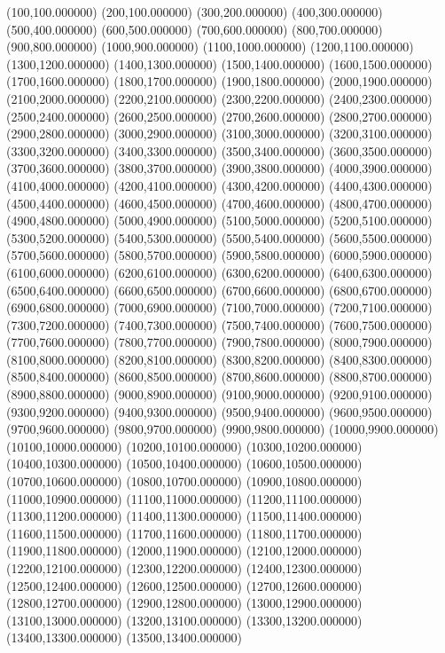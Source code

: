 (100,100.000000)
(200,100.000000)
(300,200.000000)
(400,300.000000)
(500,400.000000)
(600,500.000000)
(700,600.000000)
(800,700.000000)
(900,800.000000)
(1000,900.000000)
(1100,1000.000000)
(1200,1100.000000)
(1300,1200.000000)
(1400,1300.000000)
(1500,1400.000000)
(1600,1500.000000)
(1700,1600.000000)
(1800,1700.000000)
(1900,1800.000000)
(2000,1900.000000)
(2100,2000.000000)
(2200,2100.000000)
(2300,2200.000000)
(2400,2300.000000)
(2500,2400.000000)
(2600,2500.000000)
(2700,2600.000000)
(2800,2700.000000)
(2900,2800.000000)
(3000,2900.000000)
(3100,3000.000000)
(3200,3100.000000)
(3300,3200.000000)
(3400,3300.000000)
(3500,3400.000000)
(3600,3500.000000)
(3700,3600.000000)
(3800,3700.000000)
(3900,3800.000000)
(4000,3900.000000)
(4100,4000.000000)
(4200,4100.000000)
(4300,4200.000000)
(4400,4300.000000)
(4500,4400.000000)
(4600,4500.000000)
(4700,4600.000000)
(4800,4700.000000)
(4900,4800.000000)
(5000,4900.000000)
(5100,5000.000000)
(5200,5100.000000)
(5300,5200.000000)
(5400,5300.000000)
(5500,5400.000000)
(5600,5500.000000)
(5700,5600.000000)
(5800,5700.000000)
(5900,5800.000000)
(6000,5900.000000)
(6100,6000.000000)
(6200,6100.000000)
(6300,6200.000000)
(6400,6300.000000)
(6500,6400.000000)
(6600,6500.000000)
(6700,6600.000000)
(6800,6700.000000)
(6900,6800.000000)
(7000,6900.000000)
(7100,7000.000000)
(7200,7100.000000)
(7300,7200.000000)
(7400,7300.000000)
(7500,7400.000000)
(7600,7500.000000)
(7700,7600.000000)
(7800,7700.000000)
(7900,7800.000000)
(8000,7900.000000)
(8100,8000.000000)
(8200,8100.000000)
(8300,8200.000000)
(8400,8300.000000)
(8500,8400.000000)
(8600,8500.000000)
(8700,8600.000000)
(8800,8700.000000)
(8900,8800.000000)
(9000,8900.000000)
(9100,9000.000000)
(9200,9100.000000)
(9300,9200.000000)
(9400,9300.000000)
(9500,9400.000000)
(9600,9500.000000)
(9700,9600.000000)
(9800,9700.000000)
(9900,9800.000000)
(10000,9900.000000)
(10100,10000.000000)
(10200,10100.000000)
(10300,10200.000000)
(10400,10300.000000)
(10500,10400.000000)
(10600,10500.000000)
(10700,10600.000000)
(10800,10700.000000)
(10900,10800.000000)
(11000,10900.000000)
(11100,11000.000000)
(11200,11100.000000)
(11300,11200.000000)
(11400,11300.000000)
(11500,11400.000000)
(11600,11500.000000)
(11700,11600.000000)
(11800,11700.000000)
(11900,11800.000000)
(12000,11900.000000)
(12100,12000.000000)
(12200,12100.000000)
(12300,12200.000000)
(12400,12300.000000)
(12500,12400.000000)
(12600,12500.000000)
(12700,12600.000000)
(12800,12700.000000)
(12900,12800.000000)
(13000,12900.000000)
(13100,13000.000000)
(13200,13100.000000)
(13300,13200.000000)
(13400,13300.000000)
(13500,13400.000000)
